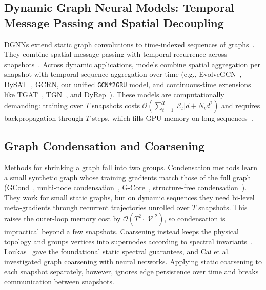 \documentclass[sigconf]{acmart}
\begin{document}
\subsection{Dynamic Graph Neural Models: Temporal Message Passing and Spatial Decoupling}
DGNNs extend static graph convolutions to time-indexed sequences of graphs~\cite{hamilton2017inductive,kipf2017semi,velickovic2018graph}. They combine spatial message passing with temporal recurrence across snapshots~\cite{pareja2020evolvegcn,sacod2026}. Across dynamic applications, models combine spatial aggregation per snapshot with temporal sequence aggregation over time (e.g., EvolveGCN~\cite{pareja2020evolvegcn}, DySAT~\cite{sankar2020dysat}, GCRN, our unified \texttt{GCN*2GRU} model, and continuous-time extensions like TGAT~\cite{xu2020inductive}, TGN~\cite{rossi2020temporal}, and DyRep~\cite{trivedi2019dyrep}). These models are computationally demanding: training over $T$ snapshots costs $\mathcal{O}\left(\sum_{t=1}^T |\mathcal{E}_t| d + N_t d^2\right)$ and requires backpropagation through $T$ steps, which fills GPU memory on long sequences~\cite{wang2023continuous,xiao2022decoupled}.

\subsection{Graph Condensation and Coarsening}
Methods for shrinking a graph fall into two groups. Condensation methods learn a small synthetic graph whose training gradients match those of the full graph (GCond~\cite{jin2021graph}, multi-node condensation~\cite{liu2022graph}, G-Core~\cite{liu2024gcore}, structure-free condensation~\cite{zheng2023structure}). They work for small static graphs, but on dynamic sequences they need bi-level meta-gradients through recurrent trajectories unrolled over $T$ snapshots. This raises the outer-loop memory cost by $\mathcal{O}(T^2 \cdot |\mathcal{V}|^2)$, so condensation is impractical beyond a few snapshots.
Coarsening instead keeps the physical topology and groups vertices into supernodes according to spectral invariants~\cite{loukas2019graph,loukas2020survey}. Loukas~\cite{loukas2019graph} gave the foundational static spectral guarantees, and Cai et al.~\cite{cai2021graph} investigated graph coarsening with neural networks. Applying static coarsening to each snapshot separately, however, ignores edge persistence over time and breaks communication between snapshots.
\end{document}
